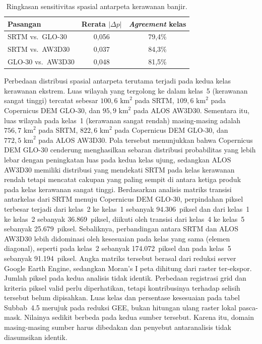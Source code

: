 \documentclass[12pt]{article}
\begin{document}
\begin{table}[ht]
\centering
\caption{Ringkasan sensitivitas spasial antarpeta kerawanan banjir.}
\label{tab:sensitivitas}
\begin{tabular}{lcc}
\toprule
\textbf{Pasangan} & \textbf{Rerata $|\Delta p|$} & \textbf{\textit{Agreement} kelas} \\
\midrule
SRTM vs.\ GLO-30   & 0,056 & 79,4\% \\
SRTM vs.\ AW3D30   & 0,037 & 84,3\% \\
GLO-30 vs.\ AW3D30 & 0,048 & 81,5\% \\
\bottomrule
\end{tabular}
\end{table}

Perbedaan distribusi spasial antarpeta terutama terjadi pada kedua kelas
kerawanan ekstrem. Luas wilayah yang tergolong ke dalam kelas~5 (kerawanan
sangat tinggi) tercatat sebesar $100{,}6\text{ km}^2$ pada SRTM,
$109{,}6\text{ km}^2$ pada Copernicus DEM GLO-30, dan $95{,}9\text{ km}^2$
pada ALOS AW3D30. Sementara itu, luas wilayah pada kelas~1 (kerawanan sangat
rendah) masing-masing adalah $756{,}7\text{ km}^2$ pada SRTM,
$822{,}6\text{ km}^2$ pada Copernicus DEM GLO-30, dan $772{,}5\text{ km}^2$
pada ALOS AW3D30. Pola tersebut menunjukkan bahwa Copernicus DEM GLO-30
cenderung menghasilkan sebaran distribusi probabilitas yang lebih lebar dengan
peningkatan luas pada kedua kelas ujung, sedangkan ALOS AW3D30 memiliki
distribusi yang mendekati SRTM pada kelas kerawanan rendah tetapi mencatat
cakupan yang paling sempit di antara ketiga produk pada kelas kerawanan
sangat tinggi. Berdasarkan
analisis matriks transisi antarkelas dari SRTM menuju Copernicus DEM GLO-30,
perpindahan piksel terbesar terjadi dari kelas~2 ke kelas~1 sebanyak
94.306~piksel dan dari kelas~1 ke kelas~2 sebanyak 36.869~piksel, diikuti oleh
transisi dari kelas~4 ke kelas~5 sebanyak 25.679~piksel. Sebaliknya,
perbandingan antara SRTM dan ALOS AW3D30 lebih didominasi oleh kesesuaian pada
kelas yang sama (elemen diagonal), seperti pada kelas~2 sebanyak
174.072~piksel dan pada kelas~5 sebanyak 91.194~piksel. Angka matriks
tersebut berasal dari reduksi server Google Earth Engine, sedangkan
Moran's I peta dihitung dari raster ter-ekspor. Jumlah piksel pada kedua
analisis tidak identik. Perbedaan registrasi grid dan kriteria piksel valid
perlu diperhatikan, tetapi kontribusinya terhadap selisih tersebut belum
dipisahkan. Luas kelas dan persentase kesesuaian pada tabel Subbab~4.5
merujuk pada reduksi GEE, bukan hitungan ulang raster lokal pasca-mask.
Nilainya sedikit berbeda pada kedua sumber tersebut. Karena itu, domain
masing-masing sumber harus dibedakan dan penyebut antaranalisis tidak
diasumsikan identik.
\end{document}
